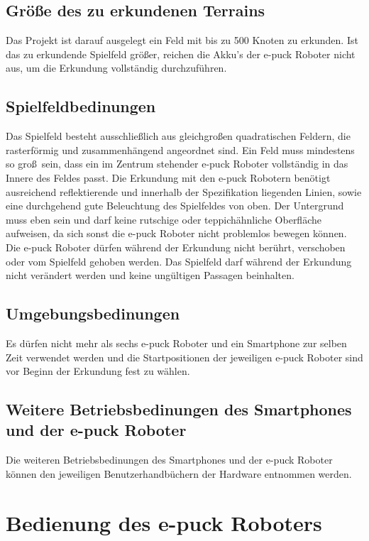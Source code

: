 \documentclass[10pt,a4paper]{article}
\let\oldsection\section
\renewcommand{\section}{\newpage \oldsection}
\begin{document}
		\subsection{Gr\"o\ss e des zu erkundenen Terrains} 
				Das Projekt ist darauf ausgelegt ein Feld mit bis zu 500 Knoten zu erkunden. Ist das zu erkundende Spielfeld gr\"o\ss er, reichen die Akku's der e-puck Roboter
				nicht aus, um die Erkundung vollst\"andig durchzuf\"uhren.
		\subsection{Spielfeldbedinungen} 
				Das Spielfeld besteht ausschlie\ss lich aus gleichgro\ss en quadratischen Feldern, die rasterf\"ormig und zusammenh\"angend angeordnet sind. Ein Feld 
				muss mindestens so gro\ss \ sein, dass ein im Zentrum stehender e-puck Roboter vollst\"andig in das Innere des Feldes passt. Die Erkundung mit den e-puck 
				Robotern ben\"otigt ausreichend reflektierende und innerhalb der Spezifikation liegenden Linien, sowie eine durchgehend gute Beleuchtung des Spielfeldes 
				von oben. Der Untergrund muss eben sein und darf keine rutschige oder teppich\"ahnliche Oberfl\"ache aufweisen, da sich sonst die e-puck Roboter nicht 
				problemlos bewegen k\"onnen. Die e-puck Roboter d\"urfen w\"ahrend der Erkundung nicht ber\"uhrt, verschoben oder vom Spielfeld gehoben werden. Das 
				Spielfeld darf w\"ahrend der Erkundung nicht ver\"andert werden und keine ung\"ultigen Passagen beinhalten. 
		\subsection{Umgebungsbedinungen} 
				Es d\"urfen nicht mehr als sechs e-puck Roboter und ein Smartphone zur selben Zeit verwendet werden und die Startpositionen der jeweiligen e-puck Roboter
				sind vor Beginn der Erkundung fest zu w\"ahlen.
		\subsection{Weitere Betriebsbedinungen des Smartphones und der e-puck Roboter} 
				Die weiteren Betriebsbedinungen des Smartphones und der e-puck Roboter k\"onnen den jeweiligen Benutzerhandb\"uchern der Hardware entnommen 
				werden.
\section{Bedienung des e-puck Roboters}
	\label{e_puck_bedienung}
\end{document}
